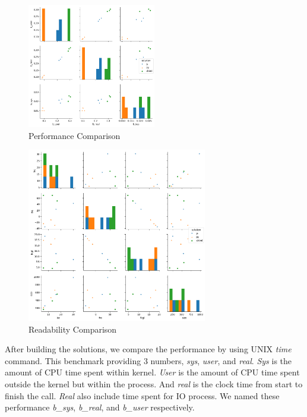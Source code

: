 \documentclass[conference]{IEEEtran}
\begin{document}
\begin{figure}
	\centering
	\includegraphics[width=0.5\textwidth]
		{benchmark/benchmark.png}
	\caption{Performance Comparison}
	\label{fig:performanceComparison}
\end{figure}

\begin{figure}
	\centering
	\includegraphics[width=0.7\textwidth]
		{benchmark/readability.png}
	\caption{Readability Comparison}
	\label{fig:readabilityComparison}
\end{figure}

After building the solutions, we compare the performance by using UNIX {\it time} command. This benchmark providing 3 numbers, {\it sys}, {\it user}, and {\it real}. {\it Sys} is the amount of CPU time spent within kernel. {\it User} is the amount of CPU time spent outside the kernel but within the process. And {\it real} is the clock time from start to finish the call. {\it Real} also include time spent for IO process. We named these performance {\it b\_sys}, {\it b\_real}, and {\it b\_user} respectively.
\end{document}
